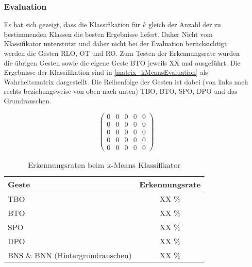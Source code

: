 \subsubsection{Evaluation}
Es hat sich gezeigt, dass die Klassifikation für $k$ gleich der Anzahl der zu bestimmenden Klassen die besten Ergebnisse liefert. Daher 
Nicht vom Klassifikator unterstützt und daher nicht bei der Evaluation berücksichtigt werden die Gesten \ac{RLO}, \ac{OT} und \ac{RO}. Zum Testen der Erkennungsrate wurden die übrigen Gesten sowie die eigene Geste BTO jeweils XX mal ausgeführt. Die Ergebnisse der Klassifikation sind in  \autoref{matrix_kMeansEvaluation} als Wahrheitsmatrix dargestellt. Die Reihenfolge der Gesten ist dabei (von links nach rechts beziehungsweise von oben nach unten) \ac{TBO}, BTO, \ac{SPO}, \ac{DPO} und das Grundrauschen.

\begin{center}
\begin{equation}
\label{matrix_kMeansEvaluation}
\begin{pmatrix}
0 & 0 & 0 & 0 & 0\\
0 & 0 & 0 & 0 & 0\\
0 & 0 & 0 & 0 & 0\\
0 & 0 & 0 & 0 & 0\\
0 & 0 & 0 & 0 & 0
\end{pmatrix}
\end{equation}
\end{center}


\begin{table}[h]
\centering
\begin{tabular}{|p{}|c|}
\hline
 \textbf{Geste} & \textbf{Erkennungsrate} \\
 \hline
  \ac{TBO} & XX \% \\
 \hline
  BTO & XX \% \\
 \hline
  \ac{SPO} & XX \% \\
 \hline
  DPO & XX \% \\
 \hline
  \ac{BNS} \& \ac{BNN} (Hintergrund\-rauschen) & XX \%\\
 \hline
\end{tabular}
\caption[Erkennungsraten beim k-Means Klassifikator]{Erkennungsraten beim k-Means Klassifikator}
\label{tab:kMeansEvaluation}
\end{table}



